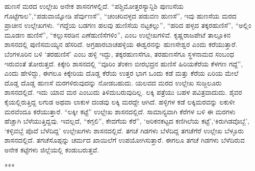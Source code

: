 ಹುಣಸೆ ಮರದ ಉಲ್ಲೇಖ ಅನೇಕ ಶಾಸನಗಳಲ್ಲಿದೆ. “ಪಶ್ಚಿಮೋತ್ತರಸ್ಯಾನ್ದಿಶಿ ಪುಣುಸೆಯ ಗೊಟ್ಟೆಗಾಲ”,\break “ಪಡುವಾಯ್ನೋಡಿ ಪೆರ್ವುಣಸೆ”, “ಚಂಚರಿವಳ್ಳದ ಪಡುವಣ ಹುಣಸೆ”, ಇವು ಹುಣಸೆಯ ಮರದ ಪ್ರಾಚೀನ ಉಲ್ಲೇಖಗಳು. “ಗದ್ದೆಯ ಬಡಗಣ ಹಲವು ಹುಣಿಸೆಯ ನಟ್ಟಕಲ್ಲು”, “ಹರಿದ ಹಳ್ಳದ ತಕ್ಕರಹುಣಿಸೆ”, “ಅಲ್ಲಿಂ ಮೂಡಣ ಹುಣಿಸೆ”, “ಕಲ್ಲುಸರಡಿನ ಎಣೆಹುಣಿಸೆಗಳಿಂ”, ಎಂಬ ಉಲ್ಲೇಖಗಳಿವೆ. ಕೃಷ್ಣರಾಜಪೇಟೆ ತಾಲ್ಲೂಕಿನ ಶಾಸನದಲ್ಲಿ ಪುಣಿಸಮಯ್ಯನ ಹೆಸರಿದೆ. ಅಗ್ರಹಾರಬಾಚಹಳ್ಳಿಯ ಈಶ್ವರನನ್ನು ಹುಣಸೇಶ್ವರ ಎಂದು ಕರೆಯುತ್ತಾರೆ. ಬೆಂಗಳೂರಿನ ಬಳಿ ‘ತರಹುಣಿಸೆ’ ಎಂಬ ಹಳ್ಳಿ ಇದ್ದು, ತಕ್ಕರಹುಣಸೆಗೂ, ತರಹುಣಸೆಗೂ ಸ್ಥಳನಾಮದ ಸಂಬಂಧ ಇರುವಂತೆ ತೋರುತ್ತದೆ. ಕಿಕ್ಕೇರಿ ಶಾಸನದಲ್ಲಿ “ವೂರಿಂ ತೆಂಕಣ ಬೀರಭದ್ರನ ಹುಣಿಸೆ ಹಿರಿಯಕೆರೆಯ ಕೆಳಗಣ ಗದ್ದೆ”, ಎಂದು ಹೇಳಿದ್ದು, ಈಗಲೂ ಕಿಕ್ಕೇರಿಯ ದೊಡ್ಡ ಕೆರೆಯ ಉತ್ತರ ಭಾಗ ಒಂದು ಕಡೆ ಮತ್ತು ಕೆರೆಯ ಏರಿಯ ಮೇಲೆ ದೊಡ್ಡ ದೊಡ್ಡ ಹುಣಸೆ ಮರಗಳಿರುವುದನ್ನು ನೋಡಬಹುದು. ಯಲವದ ಮರದ ಉಲ್ಲೇಖ ಸುಜ್ಜಲೂರು ಶಾಸನದಲ್ಲಿದೆ. ಇದು ಯಾವ ಮರ ಎಂಬುದು ತಿಳಿದುಬರುವುದಿಲ್ಲ. ಲಕ್ಕಿ ಪತ್ರೆಯು ಬಹಳ ಪವಿತ್ರವಾದುದು. ಶೈವರ ಕೈಯಲ್ಲಿರುತ್ತಿದ್ದ ಲಗುಡ ಅಥವಾ ಲಾಕುಳ ದಂಡವು ಲಕ್ಕಿ ಮರದ್ದೇ ಆಗಿದೆ. ಹಳ್ಳಿಗಳ ಕಡೆ ಲಕ್ಕಿ\break ಮರವನ್ನು ಲಕುಳೀ ಮರವೆಂದೂ ಕರೆಯುತ್ತಾರೆ. “ಲಕ್ಕೀ ಕಟ್ಟೆ” ಉಲ್ಲೇಖ ಶಾಸನದಲ್ಲಿದೆ. ಸಾಮಾನ್ಯವಾಗಿ ಕೆರೆಗಳ ಬಳಿ ಈ ಮರಗಳು ಹೆಚ್ಚಾಗಿ ಬೆಳೆಯುತ್ತಿದ್ದವು. ಇವಲ್ಲದೆ, “ಕಗ್ಗಲಿ”, ಕೇದಗೆಯ ಕೆರೆ”, ‘ಅರಿಕನಕಟ್ಟದ ಕಣಿಗಿಲೆಯ ಕಟ್ಟೆ’,\break ‘ಕಿರುಗಿಡವೊಬ್ಬೆ’, ‘ಕಳ್ಳಿವಬ್ಬೆ ಪೊದೆ ಬೆಳೆದಿದ್ದ’ ಉಲ್ಲೇಖಗಳು ಶಾಸನದಲ್ಲಿವೆ. ತಗಚೆ ಗಿಡಗಳು ಬೆಳೆದಿದ್ದ ತಗಚೆಗೆರೆ ಉಲ್ಲೇಖ ಬೆಳ್ಳೂರು ಶಾಸನದಲ್ಲಿದೆ. ತಗಚೆಸೊಪ್ಪನ್ನು ಚರ್ಮದ ಖಾಯಿಲೆಗೆ ಉಪಯೋಗಿಸುತ್ತಾರೆ. ಈಗಲೂ ತಗಚೆ ಗಿಡಗಳು ಬೆಳೆದಿರುವ ಅನೇಕ ಕಟ್ಟೆಗಳು ಜಿಲ್ಲೆಯಲ್ಲಿ ಕಂಡುಬರುತ್ತವೆ.

\begin{center}
***
\end{center}

\theendnotes

